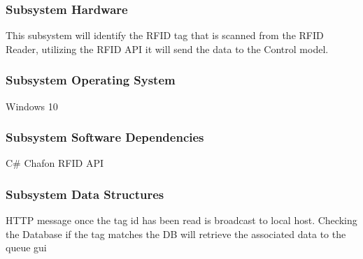 \subsubsection{Subsystem Hardware}
This subsystem will identify the RFID tag that is scanned from the RFID Reader, utilizing the RFID
API it will send the data to the Control model.

\subsubsection{Subsystem Operating System}
Windows 10

\subsubsection{Subsystem Software Dependencies}
C# Chafon RFID API


\subsubsection{Subsystem Data Structures}
HTTP message once the tag id has been read is broadcast to local host. Checking the Database if the tag matches the DB will retrieve the associated data to the queue gui 




